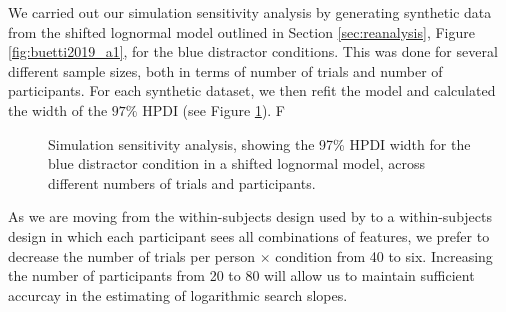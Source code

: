 \documentclass[smallextended, natbib]{svjour3}       %
\begin{document}
We carried out our simulation sensitivity analysis by generating synthetic data from the shifted lognormal model outlined in Section \ref{sec:reanalysis}, Figure \ref{fig:buetti2019_a1}, for the blue distractor conditions. This was done for several different sample sizes, both in terms of number of trials and number of participants. For each synthetic dataset, we then refit the model and calculated the width of the $97\%$ HPDI (see Figure \ref{fig:power_plot}). F

\begin{figure}
\centering
{}
\caption{Simulation sensitivity analysis, showing the 97\% HPDI width for the blue distractor condition in a shifted lognormal model, across different numbers of trials and participants. }
\label{fig:power_plot}
\end{figure}

As we are moving from the within-subjects design used by \cite{buetti2019predicting} to a within-subjects design in which each participant sees all combinations of features, we prefer to decrease the number of trials per person $\times$ condition from 40 to six. Increasing the number of participants from 20 to 80 will allow us to maintain sufficient accurcay in the estimating of logarithmic search slopes. 
\end{document}

